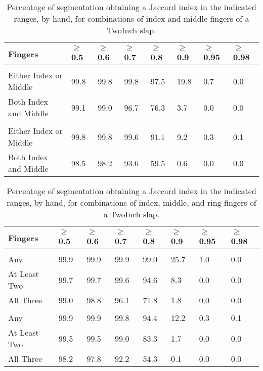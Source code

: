 \documentclass[]{article}
\begin{document}
\begin{table}[!h]

\caption{\label{tab:twoinch-per-hand-index-middle-jaccard}Percentage of segmentation obtaining a Jaccard index in the indicated ranges, by hand, for combinations of index and middle fingers of a TwoInch slap.}
\centering
\begin{tabular}{llllllll}
\toprule
Fingers & $\ge$0.5 & $\ge$0.6 & $\ge$0.7 & $\ge$0.8 & $\ge$0.9 & $\ge$0.95 & $\ge$0.98\\
\midrule
\addlinespace[0.3em]
\multicolumn{8}{l}{\textbf{Right}}\\
\rowcolor{gray!6}  \hspace{1em}Either Index or Middle & 99.8 & 99.8 & 99.8 & 97.5 & 19.8 & 0.7 & 0.0\\
\hspace{1em}Both Index and Middle & 99.1 & 99.0 & 96.7 & 76.3 & 3.7 & 0.0 & 0.0\\
\addlinespace[0.3em]
\multicolumn{8}{l}{\textbf{Left}}\\
\rowcolor{gray!6}  \hspace{1em}Either Index or Middle & 99.8 & 99.8 & 99.6 & 91.1 & 9.2 & 0.3 & 0.1\\
\hspace{1em}Both Index and Middle & 98.5 & 98.2 & 93.6 & 59.5 & 0.6 & 0.0 & 0.0\\
\bottomrule
\end{tabular}
\end{table}

\begin{table}[!h]

\caption{\label{tab:twoinch-per-hand-index-middle-ring-jaccard}Percentage of segmentation obtaining a Jaccard index in the indicated ranges, by hand, for combinations of index, middle, and ring fingers of a TwoInch slap.}
\centering
\begin{tabular}{llllllll}
\toprule
Fingers & $\ge$0.5 & $\ge$0.6 & $\ge$0.7 & $\ge$0.8 & $\ge$0.9 & $\ge$0.95 & $\ge$0.98\\
\midrule
\addlinespace[0.3em]
\multicolumn{8}{l}{\textbf{Right}}\\
\rowcolor{gray!6}  \hspace{1em}Any & 99.9 & 99.9 & 99.9 & 99.0 & 25.7 & 1.0 & 0.0\\
\hspace{1em}At Least Two & 99.7 & 99.7 & 99.6 & 94.6 & 8.3 & 0.0 & 0.0\\
\rowcolor{gray!6}  \hspace{1em}All Three & 99.0 & 98.8 & 96.1 & 71.8 & 1.8 & 0.0 & 0.0\\
\addlinespace[0.3em]
\multicolumn{8}{l}{\textbf{Left}}\\
\hspace{1em}Any & 99.9 & 99.9 & 99.8 & 94.4 & 12.2 & 0.3 & 0.1\\
\rowcolor{gray!6}  \hspace{1em}At Least Two & 99.5 & 99.5 & 99.0 & 83.3 & 1.7 & 0.0 & 0.0\\
\hspace{1em}All Three & 98.2 & 97.8 & 92.2 & 54.3 & 0.1 & 0.0 & 0.0\\
\bottomrule
\end{tabular}
\end{table}
\end{document}
